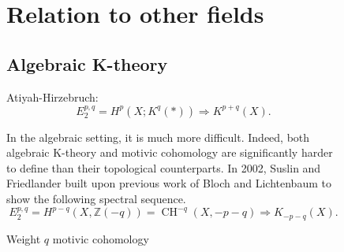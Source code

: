 \documentclass[leqno, openany]{memoir}
\theoremstyle{definition}
\theoremstyle{remark}
\theoremstyle{plain}
\theoremstyle{definition}
\theoremstyle{remark}
\newcommand{\Z}{\mathbb{Z}}
\newcommand{\mc}[1]{\mathcal{#1}}
\DeclareMathOperator{\Pic}{Pic}
\DeclareMathOperator{\CH}{CH}
\begin{document}
\begin{figure}[htpb] \begin{center}  \end{center} \caption{Weight $q$
                            motivic cohomology}%


 

\section{Relation to other fields} \subsection{Algebraic K-theory}
Atiyah-Hirzebruch: \[E_2^{p, q}=H^p(X; K^q(*))\Rightarrow K^{p+q}(X).\]

In the algebraic setting, it is much more difficult.  Indeed, both algebraic
K-theory and motivic cohomology are significantly harder to define than their
topological counterparts.  In 2002, Suslin and Friedlander built upon previous
work of Bloch and Lichtenbaum to show the following spectral sequence.  \[
    E_2^{p,q}=H^{p-q}(X, \Z(-q))=\CH^{-q}(X, -p-q)\Rightarrow K_{-p-q}(X).  \]

\end{figure}
\end{document}
